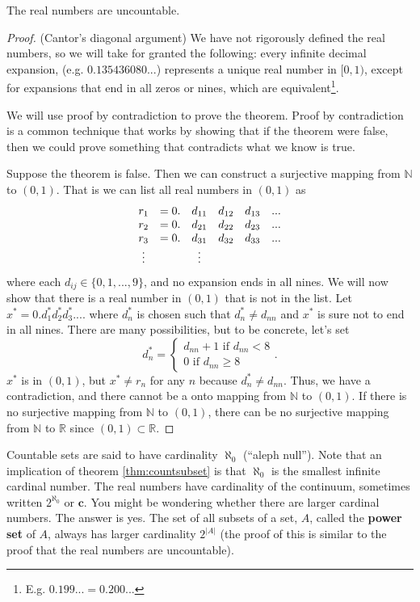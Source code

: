 \begin{theorem}
  The real numbers are uncountable.
\end{theorem}
\begin{proof} (Cantor's diagonal argument)
  We have not rigorously defined the real numbers, so we will take for
  granted the following: every infinite decimal expansion,
  (e.g. $0.135436080...$) represents a unique real number in $[0,1)$,
  except for expansions that end in all zeros or nines, which are
  equivalent\footnote{E.g. $0.199... = 0.200...$}. 
  
  We will use proof by contradiction to prove the theorem. Proof by
  contradiction is a common technique that works by showing that if
  the theorem were false, then we could prove something that
  contradicts what we know is true. 

  Suppose the theorem is false. Then we can construct a surjective
  mapping from $\mathbb{N}$ to $(0,1)$. That is we can list all real
  numbers in $(0,1)$ as
  \begin{align*}
    \begin{array}{c c ccc c}
      r_1 & =  0. & d_{11}& d_{12}& d_{13}& ... \\
      r_2 & =  0. &d_{21}& d_{22}& d_{23}& ... \\
      r_3 & =  0. &d_{31}& d_{32}& d_{33}& ... \\
      \vdots & & \vdots 
    \end{array}
  \end{align*}
  where each $d_{ij} \in \{0,1,...,9\}$, and no expansion ends in all
  nines. We will now show that there is a real number in $(0,1)$ that
  is not in the list. Let $x^* = 0.d^*_1 d^*_2 d^*_3 ...$. where
  $d^*_n$ is chosen such that $d^*_n \neq d_{nn}$ and $x^*$ is sure
  not to end in all nines. There are many possibilities, but to be
  concrete, let's set
  \[ 
  d^*_n
  = \begin{cases} d_{nn} + 1 \text{ if } d_{nn} < 8 \\
    0 \text{ if } d_{nn} \geq 8 
  \end{cases} .
  \]      
  $x^*$ is in $(0,1)$, but $x^* \neq r_n$ for any $n$ because $d^*_n
  \neq d_{nn}$. Thus, we have a contradiction, and there cannot be a
  onto mapping from $\mathbb{N}$ to $(0,1)$.  If there is no
  surjective mapping from $\mathbb{N}$ to $(0,1)$, there can be no
  surjective mapping from $\mathbb{N}$ to $\mathbb{R}$ since $(0,1)
  \subset \mathbb{R}$. 
\end{proof}
Countable sets are said to have cardinality $\aleph_0$ (``aleph
null''). Note that an implication of theorem \ref{thm:countsubset} is
that $\aleph_0$ is the smallest infinite cardinal number. The real
numbers have cardinality of the continuum, sometimes written
$2^{\aleph_0}$ or $\mathbf{c}$. You might be wondering whether there
are larger cardinal numbers. The answer is yes. The set of all subsets
of a set, $A$, called the \textbf{power set} of $A$, always has larger
cardinality $2^{|A|}$ (the proof of this is similar to the proof that
the real numbers are uncountable). 

